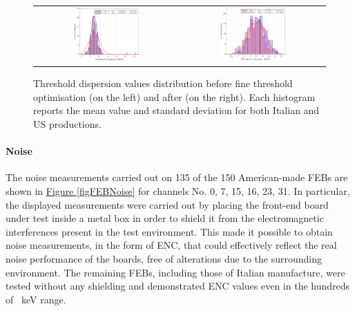 \begin{figure}[h!]
    \centering
    \begin{tabular}{cc}
        \includegraphics[width=0.475\textwidth]{Images/chap2/results/thrdisp_bef.pdf} & \includegraphics[width=0.475\textwidth]{Images/chap2/results/thrdisp_aft.pdf}\\
    \end{tabular}
    \caption{Threshold dispersion values distribution before fine threshold optimisation (on the left) and after (on the right). Each histogram reports the mean value and standard deviation for both Italian and US productions.}
    \label{figFEBthreshold}
\end{figure}

\paragraph{Noise} The noise measurements carried out on 135 of the 150 American-made FEBs are shown in \hyperref[figFEBNoise]{Figure \ref{figFEBNoise}} for channels No. 0, 7, 15, 16, 23, 31. In particular, the displayed measurements were carried out by placing the front-end board under test inside a metal box in order to shield it from the electromagnetic interferences present in the test environment. This made it possible to obtain noise measurements, in the form of ENC, that could effectively reflect the real noise performance of the boards, free of alterations due to the surrounding environment. The remaining FEBs, including those of Italian manufacture, were tested without any shielding and demonstrated ENC values even in the hundreds of \SI{}{\kilo\electronvolt} range.

